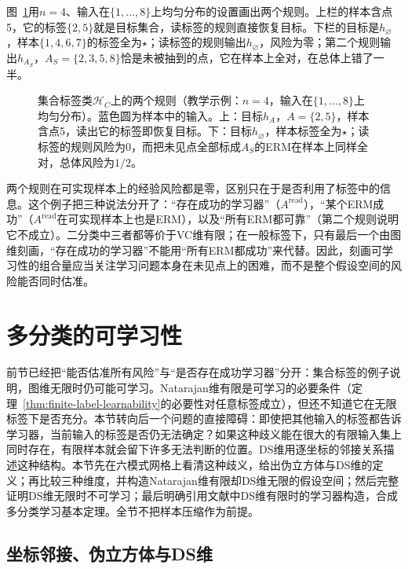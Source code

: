 图~\ref{fig:lt6-set-label-erm}用$n=4$、输入在$\{1,\ldots,8\}$上均匀分布的设置画出两个规则。上栏的样本含点5，它的标签$\{2,5\}$就是目标集合，读标签的规则直接恢复目标。下栏的目标是$h_\varnothing$，样本$\{1,4,6,7\}$的标签全为$\star$；读标签的规则输出$h_\varnothing$，风险为零；第二个规则输出$h_{A_S}$，$A_S=\{2,3,5,8\}$恰是未被抽到的点，它在样本上全对，在总体上错了一半。

\begin{figure}[htbp]
  \centering
  
  \caption{集合标签类$\mathcal H_C$上的两个规则（教学示例：$n=4$，输入在$\{1,\ldots,8\}$上均匀分布）。蓝色圆为样本中的输入。上：目标$h_A$，$A=\{2,5\}$，样本含点5，读出它的标签即恢复目标。下：目标$h_\varnothing$，样本标签全为$\star$；读标签的规则风险为0，而把未见点全部标成$A_S$的ERM在样本上同样全对，总体风险为$1/2$。}
  \label{fig:lt6-set-label-erm}
\end{figure}

两个规则在可实现样本上的经验风险都是零，区别只在于是否利用了标签中的信息。这个例子把三种说法分开了：“存在成功的学习器”（$A^{\mathrm{read}}$），“某个ERM成功”（$A^{\mathrm{read}}$在可实现样本上也是ERM），以及“所有ERM都可靠”（第二个规则说明它不成立）。二分类中三者都等价于VC维有限；在一般标签下，只有最后一个由图维刻画，“存在成功的学习器”不能用“所有ERM都成功”来代替。因此，刻画可学习性的组合量应当关注学习问题本身在未见点上的困难，而不是整个假设空间的风险能否同时估准。

\section{多分类的可学习性}
\label{sec:lt6-multiclass-learnability}
\label{sec:ds-dimension}

前节已经把“能否估准所有风险”与“是否存在成功学习器”分开：集合标签的例子说明，图维无限时仍可能可学习。Natarajan维有限是可学习的必要条件（定理~\ref{thm:finite-label-learnability}的必要性对任意标签成立），但还不知道它在无限标签下是否充分。本节转向后一个问题的直接障碍：即使把其他输入的标签都告诉学习器，当前输入的标签是否仍无法确定？如果这种歧义能在很大的有限输入集上同时存在，有限样本就会留下许多无法判断的位置。DS维用逐坐标的邻接关系描述这种结构。本节先在六模式网格上看清这种歧义，给出伪立方体与DS维的定义；再比较三种维度，并构造Natarajan维有限却DS维无限的假设空间；然后完整证明DS维无限时不可学习；最后明确引用文献中DS维有限时的学习器构造，合成多分类学习基本定理。全节不把样本压缩作为前提。

\subsection{坐标邻接、伪立方体与DS维}
\label{sec:comb-coordinate-replacements}
\label{sec:lt6-pseudocube}

